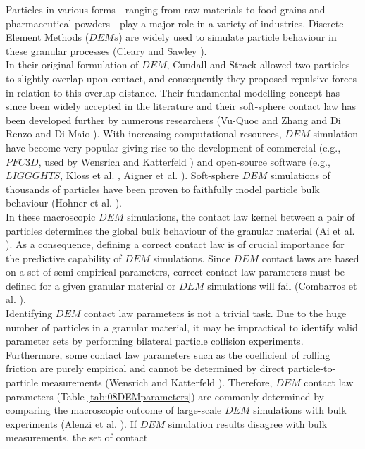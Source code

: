 \documentclass[review]{elsarticle}
\begin{document}
Particles in various forms - ranging from raw materials to food grains and pharmaceutical powders - 
play a major role in a variety of industries. 
Discrete Element Methods ($DEMs$) are widely used to simulate
particle behaviour in these granular processes (Cleary and Sawley \cite{RefWorks:130}).\\
In their original formulation of $DEM$, Cundall and Strack \cite{RefWorks:172} allowed two 
particles to slightly overlap upon contact, and consequently they proposed
repulsive forces in relation to this overlap distance.
Their fundamental modelling concept has since been widely accepted in the
literature and their soft-sphere contact law has been developed further by
numerous researchers (Vu-Quoc and Zhang \cite{RefWorks:148} and Di Renzo and Di Maio \cite{RefWorks:145}). 
With increasing computational resources, $DEM$ simulation have become very
popular giving rise to the development of commercial (e.g., $PFC3D$, used by
Wensrich and Katterfeld \cite{RefWorks:87}) and open-source software (e.g.,
$LIGGGHTS$, Kloss et al. \cite{RefWorks:136}, Aigner et al. \cite{RefWorks:139}).
Soft-sphere $DEM$ simulations of thousands of particles have been proven to 
faithfully model particle bulk behaviour (Hohner et al. \cite{RefWorks:86}). \\
In these macroscopic $DEM$ simulations, the contact law kernel between a 
pair of particles determines the global bulk behaviour of the granular material (Ai et al. \cite{RefWorks:131}). 
As a consequence, defining a correct contact law is of crucial importance for the predictive 
capability of $DEM$ simulations. 
Since $DEM$ contact laws are based 
on a set of semi-empirical parameters, correct contact law 
parameters must be defined for a given granular material
or $DEM$ simulations will fail (Combarros et al. \cite{RefWorks:177}). \\
Identifying $DEM$ contact law parameters is not a trivial task. 
Due to the huge number of particles in a granular material, it
may be impractical to identify valid parameter sets by performing bilateral 
particle collision experiments. 
Furthermore, some contact law parameters such as the coefficient of rolling
friction are purely empirical and cannot be determined by direct 
particle-to-particle measurements (Wensrich and Katterfeld \cite{RefWorks:87}).
Therefore, $DEM$ contact law parameters (Table \ref{tab:08DEMparameters}) are
commonly determined by comparing the macroscopic outcome of large-scale $DEM$ simulations with 
bulk experiments (Alenzi et al. \cite{RefWorks:91}). 
If $DEM$ simulation results disagree with bulk measurements, the set of contact
\end{document}
